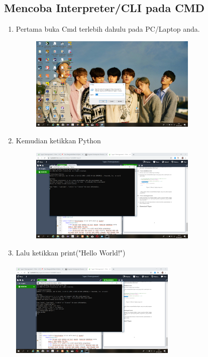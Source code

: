 \documentclass{article}
\begin{document}
\subsection{Mencoba Interpreter/CLI pada CMD}
\begin{enumerate}
    \item Pertama buka Cmd terlebih dahulu pada PC/Laptop anda.
        \begin{figure}[h]
            \centerline{\includegraphics[width=8cm]{image/cmd.png}}
        \end{figure}
    \item Kemudian ketikkan Python
        \begin{figure}[h]
            \centerline{\includegraphics[width=8cm]{image/python.png}}
        \end{figure}
    \item Lalu ketikkan print("Hello World!")
    \paragraph{}
            \centerline{\includegraphics[width=8cm]{image/printhelloworld.png}}
\end{enumerate}
\end{document}
